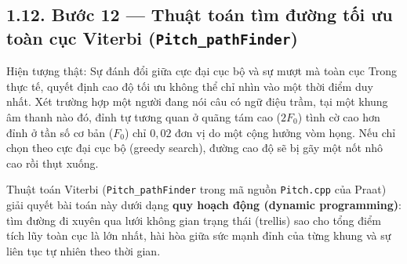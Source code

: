 \subsection*{1.12. Bước 12 --- Thuật toán tìm đường tối ưu toàn cục Viterbi (\texttt{Pitch\_pathFinder})}

\begin{firstprin}{Hiện tượng thật: Sự đánh đổi giữa cực đại cục bộ và sự mượt mà toàn cục}
Trong thực tế, quyết định cao độ tối ưu không thể chỉ nhìn vào một thời điểm duy nhất. Xét trường hợp một người đang nói câu có ngữ điệu trầm, tại một khung âm thanh nào đó, đỉnh tự tương quan ở quãng tám cao ($2F_0$) tình cờ cao hơn đỉnh ở tần số cơ bản ($F_0$) chỉ $0{,}02$ đơn vị do một cộng hưởng vòm họng. Nếu chỉ chọn theo cực đại cục bộ (greedy search), đường cao độ sẽ bị gãy một nốt nhô cao rồi thụt xuống.

Thuật toán Viterbi (\texttt{Pitch\_pathFinder} trong mã nguồn \texttt{Pitch.cpp} của Praat) giải quyết bài toán này dưới dạng \textbf{quy hoạch động (dynamic programming)}: tìm đường đi xuyên qua lưới không gian trạng thái (trellis) sao cho tổng điểm tích lũy toàn cục là lớn nhất, hài hòa giữa sức mạnh đỉnh của từng khung và sự liên tục tự nhiên theo thời gian.
\end{firstprin}

